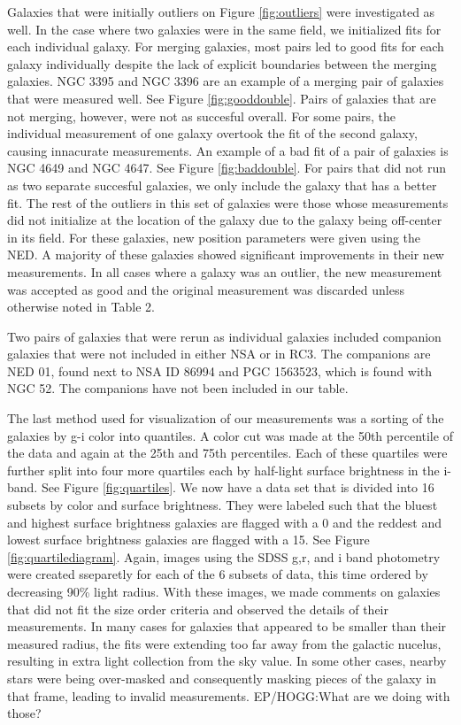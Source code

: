 \documentclass[12pt,preprint,pdftex]{aastex}
\begin{document}
Galaxies that were initially outliers on Figure \ref{fig:outliers}
were investigated as well. In the case where two galaxies were in the
same field, we initialized fits for each individual galaxy. For
merging galaxies, most pairs led to good fits for each galaxy
individually despite the lack of explicit boundaries between the
merging galaxies. NGC 3395 and NGC 3396 are an example of a merging
pair of galaxies that were measured well. See Figure
\ref{fig:gooddouble}. Pairs of galaxies that are not merging, however,
were not as succesful overall. For some pairs, the individual
measurement of one galaxy overtook the fit of the second galaxy,
causing innacurate measurements. An example of a bad fit of a pair of
galaxies is NGC 4649 and NGC 4647. See Figure \ref{fig:baddouble}. For
pairs that did not run as two separate succesful galaxies, we only
include the galaxy that has a better fit. The rest of the outliers in
this set of galaxies were those whose measurements did not initialize
at the location of the galaxy due to the galaxy being off-center in
its field. For these galaxies, new position parameters were given
using the NED. A majority of these galaxies showed significant
improvements in their new measurements. In all cases where a galaxy
was an outlier, the new measurement was accepted as good and the
original measurement was discarded unless otherwise noted in Table 2.

Two pairs of galaxies that were rerun as individual galaxies
included companion galaxies that were not included in either
NSA or in RC3. The companions are NED 01, found next to NSA ID
86994 and PGC 1563523, which is found with NGC 52. The companions have
not been included in our table.

The last method used for visualization of our measurements was a
sorting of the galaxies by g-i color into quantiles. A color cut was
made at the 50th percentile of the data and again at the 25th and 75th
percentiles. Each of these quartiles were further split into four more
quartiles each by half-light surface brightness in the i-band. See
Figure \ref{fig:quartiles}. We now have a data set that is divided
into 16 subsets by color and surface brightness. They were labeled
such that the bluest and highest surface brightness galaxies are
flagged with a 0 and the reddest and lowest surface brightness
galaxies are flagged with a 15. See Figure
\ref{fig:quartilediagram}. Again, images using the SDSS g,r, and i
band photometry were created sseparetly for each of the 6 subsets of
data, this time ordered by decreasing 90\% light radius. With these
images, we made comments on galaxies that did not fit the size order
criteria and observed the details of their measurements. In many cases
for galaxies that appeared to be smaller than their measured radius,
the fits were extending too far away from the galactic nucelus,
resulting in extra light collection from the sky value. In some other
cases, nearby stars were being over-masked and consequently masking
pieces of the galaxy in that frame, leading to invalid
measurements. EP/HOGG:What are we doing with those?
\end{document}
